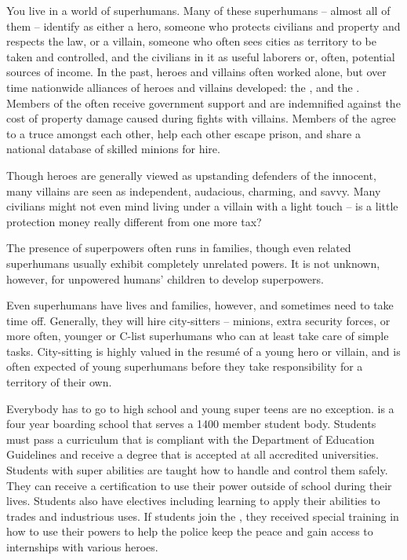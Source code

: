 \documentclass[blue]{LRSguildcamp1}
\begin{document}
\name{\bWorld{}}
You live in a world of superhumans.  Many of these superhumans -- almost all of them -- identify as either a hero, someone who protects civilians and property and respects the law, or a villain, someone who often sees cities as territory to be taken and controlled, and the civilians in it as useful laborers or, often, potential sources of income.  In the past, heroes and villains often worked alone, but over time nationwide alliances of heroes and villains developed: the \cHeroLeague{\intro}, and the \cVillainCompact{\intro}.  Members of the \cHeroLeague{\intro} often receive government support and are indemnified against the cost of property damage caused during fights with villains.  Members of the \cVillainCompact{\intro} agree to a truce amongst each other, help each other escape prison, and share a national database of skilled minions for hire.

Though heroes are generally viewed as upstanding defenders of the innocent, many villains are seen as independent, audacious, charming, and savvy.  Many civilians might not even mind living under a villain with a light touch -- is a little protection money really different from one more tax?

The presence of superpowers often runs in families, though even related superhumans usually exhibit completely unrelated powers.  It is not unknown, however, for unpowered humans' children to develop superpowers.

Even superhumans have lives and families, however, and sometimes need to take time off.  Generally, they will hire city-sitters -- minions, extra security forces, or more often, younger or C-list superhumans who can at least take care of simple tasks.  City-sitting is highly valued in the resum\'e of a young hero or villain, and is often expected of young superhumans before they take responsibility for a territory of their own.

Everybody has to go to high school and young super teens are no exception. \pSuperSchool{} is a four year boarding school that serves a 1400 member student body. Students must pass a curriculum that is compliant with the Department of Education Guidelines and receive a degree that is accepted at all accredited universities. Students with super abilities are taught how to handle and control them safely. They can receive a certification to use their power outside of school during their lives. Students also have electives including learning to apply their abilities to trades and industrious uses.  If students join the \cHeroLeague{\intro}, they received special training in how to use their powers to help the police keep the peace and gain access to internships with various heroes. 
\end{document}
